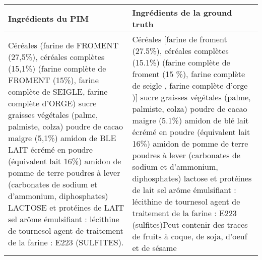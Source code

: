 \begin{longtable}{p{7cm}p{7cm}}
                                                                                                                                                                                                                                                                                                                                                                                                                                                                                                                                                                                                                                                                                                                                                                                              Ingrédients du PIM &                                                                                                                                                                                                                                                                                                                                                                                                                                                                                                                                                                                                                                                                                                                                                                             Ingrédients de la ground truth \\
\midrule
\endhead
                                                                                                                                                                                                                                                                         Céréales (farine de FROMENT (27,5\%), céréales complètes (15,1\%) (farine complète de FROMENT (15\%), farine complète de SEIGLE, farine complète d'ORGE)  sucre  graisses végétales (palme, palmiste, colza)  poudre de cacao maigre (5,1\%)  amidon de BLE  LAIT écrémé en poudre (équivalent lait 16\%)  amidon de pomme de terre  poudres à lever (carbonates de sodium et d'ammonium, diphosphates)  LACTOSE et protéines de LAIT  sel  arôme  émulsifiant : lécithine de tournesol  agent de traitement de la farine : E223 (SULFITES). &                                                                                                                                                                                                   Céréales [farine de froment (27.5\%), céréales complètes (15.1\%) (farine complète de froment (15 \%), farine complète de seigle , farine complète d'orge )] sucre graisses végétales (palme, palmiste, colza) poudre de cacao maigre (5.1\%) amidon de blé lait écrémé en poudre (équivalent lait 16\%) amidon de pomme de terre poudres à lever (carbonates de sodium et d'ammonium, diphosphates) lactose et protéines de lait sel arôme émulsifiant : lécithine de tournesol agent de traitement de la farine : E223 (sulfites)\newline Peut contenir des traces de fruits à coque, de soja, d'oeuf et de sésame \\ \hline

\end{longtable}
